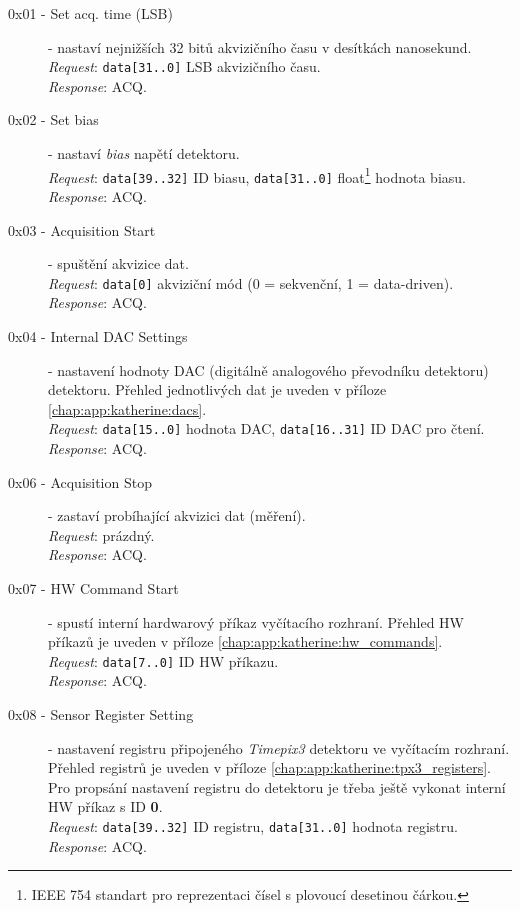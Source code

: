 \begin{description}
    \item[0x01 - Set acq. time (LSB)] - nastaví nejnižších 32 bitů akvizičního času v desítkách nanosekund.
    \\\textit{Request}: \texttt{data[31..0]} LSB akvizičního času.
    \\\textit{Response}: ACQ.

    \item[0x02 - Set bias] - nastaví \textit{bias} napětí detektoru.
    \\\textit{Request}: \texttt{data[39..32]} ID biasu, \texttt{data[31..0]} float\footnote{IEEE 754 standart pro reprezentaci čísel s plovoucí desetinou čárkou.} hodnota biasu.
    \\\textit{Response}: ACQ.
    
    \item[0x03 - Acquisition Start] - spuštění akvizice dat.
    \\\textit{Request}: \texttt{data[0]} akviziční mód (0 = sekvenční, 1 = data-driven).
    \\\textit{Response}: ACQ.
    
    \item[0x04 - Internal DAC Settings] - nastavení hodnoty DAC (digitálně analogového převodníku detektoru) detektoru. Přehled jednotlivých dat je uveden v příloze \ref{chap:app:katherine:dacs}.
    \\\textit{Request}: \texttt{data[15..0]} hodnota DAC, \texttt{data[16..31]} ID DAC pro čtení.
    \\\textit{Response}: ACQ.

    
    \item[0x06 - Acquisition Stop] - zastaví probíhající akvizici dat (měření).
    \\\textit{Request}: prázdný.
    \\\textit{Response}: ACQ.
    
    \item[0x07 - HW Command Start] - spustí interní hardwarový příkaz vyčítacího rozhraní. Přehled HW příkazů je uveden v příloze \ref{chap:app:katherine:hw_commands}.
    \\\textit{Request}: \texttt{data[7..0]} ID HW příkazu.
    \\\textit{Response}: ACQ.

    \item[0x08 - Sensor Register Setting] - nastavení registru připojeného \textit{Timepix3} detektoru ve vyčítacím rozhraní. Přehled registrů je uveden v příloze \ref{chap:app:katherine:tpx3_registers}. Pro propsání nastavení registru do detektoru je třeba ještě vykonat interní HW příkaz s ID \textbf{0}.
    \\\textit{Request}: \texttt{data[39..32]} ID registru, \texttt{data[31..0]} hodnota registru.
    \\\textit{Response}: ACQ.
    

\end{description}
